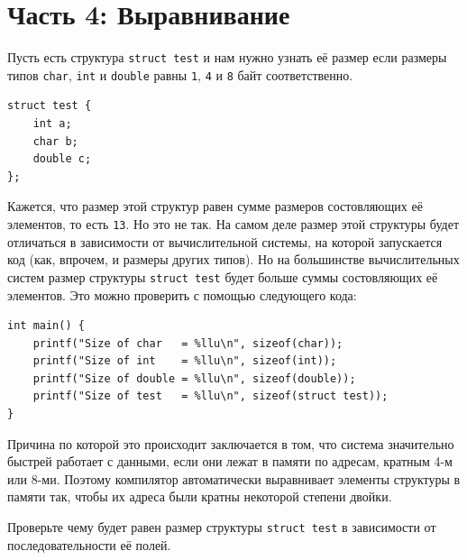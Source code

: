 \documentclass{article}
\begin{document}
\newpage
\section*{Часть 4: Выравнивание}
Пусть есть структура \texttt{struct test} и нам нужно узнать её размер если размеры типов \texttt{char}, \texttt{int} и \texttt{double} равны \texttt{1}, \texttt{4} и \texttt{8} байт соответственно.
\begin{lstlisting}
struct test {
    int a;
    char b;
    double c;
};
\end{lstlisting}
Кажется, что размер этой структур равен сумме размеров состовляющих её элементов, то есть \texttt{13}. Но это не так. 
На самом деле размер этой структуры будет отличаться в зависимости от вычислительной системы, на которой запускается код (как, впрочем, и размеры других типов). Но на большинстве вычислительных систем размер структуры \texttt{struct test} будет больше суммы состовляющих её элементов. Это можно проверить с помощью следующего кода:


\begin{lstlisting}
int main() {
    printf("Size of char   = %llu\n", sizeof(char));
    printf("Size of int    = %llu\n", sizeof(int));
    printf("Size of double = %llu\n", sizeof(double));
    printf("Size of test   = %llu\n", sizeof(struct test));
}
\end{lstlisting}

Причина по которой это происходит заключается в том, что система значительно быстрей работает с данными, если они лежат в памяти по адресам, кратным 4-м или 8-ми. Поэтому компилятор автоматически выравнивает элементы структуры в памяти так, чтобы их адреса были кратны некоторой степени двойки.

Проверьте чему будет равен размер структуры \texttt{struct test} в зависимости от последовательности её полей.
\end{document}
